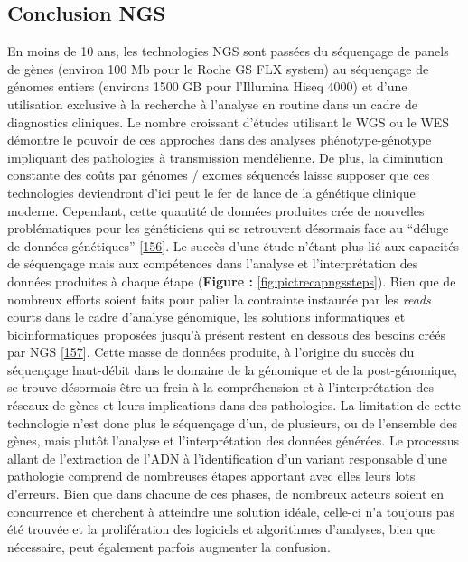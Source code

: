 \documentclass[12pt,twoside]{ugathesis}
\theoremstyle{definition}
\theoremstyle{definition}
\theoremstyle{remark}
\begin{document}
\newpage

\subsection{Conclusion NGS}\label{conclusion-ngs}

En moins de 10 ans, les technologies NGS sont passées du séquençage de
panels de gènes (environ 100 Mb pour le Roche GS FLX system) au
séquençage de génomes entiers (environs 1500 GB pour l'Illumina Hiseq
4000) et d'une utilisation exclusive à la recherche à l'analyse en
routine dans un cadre de diagnostics cliniques. Le nombre croissant
d'études utilisant le WGS ou le WES démontre le pouvoir de ces approches
dans des analyses phénotype-génotype impliquant des pathologies à
transmission mendélienne. De plus, la diminution constante des coûts par
génomes / exomes séquencés laisse supposer que ces technologies
deviendront d'ici peut le fer de lance de la génétique clinique moderne.
Cependant, cette quantité de données produites crée de nouvelles
problématiques pour les généticiens qui se retrouvent désormais face au
``déluge de données génétiques''
{[}\protect\hyperlink{ref-Schatz2013}{156}{]}. Le succès d'une étude
n'étant plus lié aux capacités de séquençage mais aux compétences dans
l'analyse et l'interprétation des données produites à chaque étape
(\textbf{Figure :} \ref{fig:pictrecapngssteps}). Bien que de nombreux
efforts soient faits pour palier la contrainte instaurée par les
\emph{reads} courts dans le cadre d'analyse génomique, les solutions
informatiques et bioinformatiques proposées jusqu'à présent restent en
dessous des besoins créés par NGS
{[}\protect\hyperlink{ref-McPherson2009}{157}{]}. Cette masse de données
produite, à l'origine du succès du séquençage haut-débit dans le domaine
de la génomique et de la post-génomique, se trouve désormais être un
frein à la compréhension et à l'interprétation des réseaux de gènes et
leurs implications dans des pathologies. La limitation de cette
technologie n'est donc plus le séquençage d'un, de plusieurs, ou de
l'ensemble des gènes, mais plutôt l'analyse et l'interprétation des
données générées. Le processus allant de l'extraction de l'ADN à
l'identification d'un variant responsable d'une pathologie comprend de
nombreuses étapes apportant avec elles leurs lots d'erreurs. Bien que
dans chacune de ces phases, de nombreux acteurs soient en concurrence et
cherchent à atteindre une solution idéale, celle-ci n'a toujours pas été
trouvée et la prolifération des logiciels et algorithmes d'analyses,
bien que nécessaire, peut également parfois augmenter la confusion.
\end{document}
